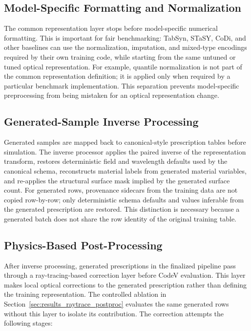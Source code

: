 \subsection{Model-Specific Formatting and Normalization}

The common representation layer stops before model-specific numerical formatting. This is important for fair benchmarking: TabSyn, STaSY, CoDi, and other baselines can use the normalization, imputation, and mixed-type encodings required by their own training code, while starting from the same untuned or tuned optical representation. For example, quantile normalization is not part of the common representation definition; it is applied only when required by a particular benchmark implementation. This separation prevents model-specific preprocessing from being mistaken for an optical representation change.

\subsection{Generated-Sample Inverse Processing}

Generated samples are mapped back to canonical-style prescription tables before simulation. The inverse processor applies the paired inverse of the representation transform, restores deterministic field and wavelength defaults used by the canonical schema, reconstructs material labels from generated material variables, and re-applies the structural surface mask implied by the generated surface count. For generated rows, provenance sidecars from the training data are not copied row-by-row; only deterministic schema defaults and values inferable from the generated prescription are restored. This distinction is necessary because a generated batch does not share the row identity of the original training table.

\subsection{Physics-Based Post-Processing}

After inverse processing, generated prescriptions in the finalized pipeline pass through a ray-tracing-based correction layer before CodeV evaluation. This layer makes local optical corrections to the generated prescription rather than defining the training representation. The controlled ablation in Section~\ref{sec:results_raytrace_postproc} evaluates the same generated rows without this layer to isolate its contribution. The correction attempts the following stages:

